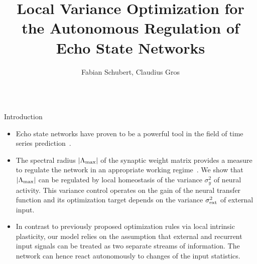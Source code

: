 \documentclass{beamer}
\title{Local Variance Optimization for the Autonomous Regulation of Echo State Networks}
\author{Fabian Schubert, Claudius Gros}
\institute{Institute for Theoretical Physics, Goethe University Frankfurt a.M.}
\date{}
\begin{document}
\begin{frame}[t]
\begin{columns}[t]
\begin{column}{.4\textwidth}
\begin{myblock}{Introduction}
\begin{itemize}
	\item Echo state networks have proven to be a powerful tool in the field of time series prediction~\citep{Jaeger_2001}.
	\item The spectral radius $|\Lambda_{\rm max}|$ of the synaptic weight matrix provides a measure to regulate the network in an appropriate working regime~\cite{Caluwaerts_2013}. We show that $|\Lambda_{\rm max}|$ can be regulated by local homeostasis of the variance $\sigma_y^2$ of neural activity. This variance control operates on the gain of the neural transfer function and its optimization target depends on the variance $\sigma_{\rm ext}^2$ of external input.
	\item In contrast to previously proposed optimization rules via local intrinsic plasticity, our model relies on the assumption that external and recurrent input signals can be treated as two separate streams of information. The network can hence react autonomously to changes of the input statistics.
\end{itemize}
\end{myblock}


\end{column}
\end{columns}
\end{frame}
\end{document}
